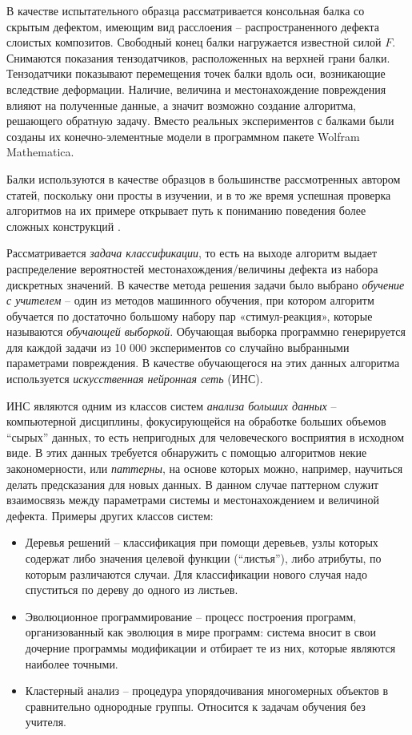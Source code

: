 \documentclass[a4paper,12pt]{article}
\theoremstyle{remark}
\begin{document}
	В качестве испытательного образца рассматривается  консольная балка со скрытым дефектом, имеющим вид расслоения -- распространенного дефекта слоистых композитов. Свободный конец балки нагружается известной силой $F$. Снимаются показания тензодатчиков, расположенных на верхней грани балки. Тензодатчики показывают перемещения точек балки вдоль оси, возникающие вследствие деформации. Наличие, величина и местонахождение повреждения влияют на полученные данные, а значит возможно создание алгоритма, решающего обратную задачу. Вместо реальных экспериментов с балками были созданы их конечно-элементные модели в программном пакете Wolfram Mathematica.
	
	Балки используются в качестве образцов в большинстве рассмотренных автором статей, поскольку они просты в изучении, и в то же время успешная проверка алгоритмов на их примере открывает путь к пониманию поведения более сложных конструкций \cite{crack_detection}.
	
	Рассматривается \textit{задача классификации}, то есть на выходе алгоритм выдает распределение вероятностей местонахождения/величины дефекта из набора дискретных значений. В качестве метода решения задачи было выбрано \textit{обучение с учителем} -- один из методов машинного обучения, при котором алгоритм обучается по достаточно большому набору пар «стимул-реакция», которые называются \textit{обучающей выборкой}. Обучающая выборка программно генерируется для каждой задачи из 10 000 экспериментов со случайно выбранными параметрами повреждения. В качестве обучающегося на этих данных алгоритма используется \textit{искусственная нейронная сеть} (ИНС).
	
	ИНС являются одним из классов систем \textit{анализа больших данных} -- компьютерной дисциплины, фокусирующейся на обработке больших объемов ``сырых'' данных, то есть непригодных для человеческого восприятия в исходном виде. В этих данных требуется обнаружить с помощью алгоритмов некие закономерности, или \textit{паттерны}, на основе которых можно, например, научиться делать предсказания для новых данных. В данном случае паттерном служит взаимосвязь между параметрами системы и местонахождением и величиной дефекта. Примеры других классов систем:
	\begin{itemize}[itemsep=0cm, topsep=0.2cm]
		\item Деревья решений -- классификация при помощи деревьев, узлы которых содержат либо значения целевой функции (``листья''), либо атрибуты, по которым различаются случаи. Для классификации нового случая надо спуститься по дереву до одного из листьев.
		\item Эволюционное программирование -- процесс построения программ, организованный как эволюция в мире программ: система вносит в свои дочерние программы модификации и отбирает те из них, которые являются наиболее точными.
		\item Кластерный анализ -- процедура упорядочивания многомерных объектов в сравнительно однородные группы. Относится к задачам обучения без учителя.
	\end{itemize}
	
\end{document}
